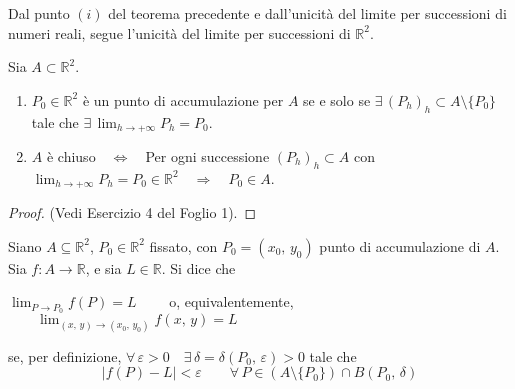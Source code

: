 
\begin{obs}
Dal punto $(i)$ del teorema precedente e dall'unicità del limite per successioni di numeri reali, segue l'unicità del limite per successioni di $\mathbb{R}^2$.
\end{obs}

\begin{proposition}
Sia $A \subset \mathbb{R}^2$.
\begin{enumerate}[labelindent=\parindent,leftmargin=*,label=\textnormal{(\roman*)},start=1]
\item $P_0 \in \mathbb{R}^2$ è un punto di accumulazione per $A$ se e solo se $\exists \, (P_h)_h \subset A \setminus \lbrace P_0 \rbrace$ tale che $\exists \, \displaystyle \lim_{h \rightarrow +\infty} P_h = P_0$.
\item $A$ è chiuso$\quad \Longleftrightarrow \quad$Per ogni successione $(P_h)_h \subset A$ con $\displaystyle \lim_{h \rightarrow +\infty} P_h = P_0 \in \mathbb{R}^2 \quad \Rightarrow \quad P_0 \in A$.
\end{enumerate}
\end{proposition}
\begin{proof}
(Vedi Esercizio 4 del Foglio 1).
\end{proof}

\begin{definition}
Siano $A \subseteq \mathbb{R}^2$, $P_0 \in \mathbb{R}^2$ fissato, con $P_0=(x_0,\, y_0)$ punto di accumulazione di $A$. Sia $f : A \longrightarrow \mathbb{R}$, e sia $L \in \mathbb{R}$.
Si dice che
\begin{center}
$\displaystyle \lim_{P \rightarrow P_0} f(P) = L \qquad$
o, equivalentemente,
$\displaystyle \qquad \lim_{(x,\, y) \rightarrow (x_0,\, y_0)} f(x,\, y) = L$
\end{center}
se, per definizione, $\forall \, \varepsilon > 0 \quad \exists \, \delta = \delta(P_0,\, \varepsilon) > 0$ tale che
$$|f(P) - L| < \varepsilon \qquad \forall \, P \in (A \setminus \lbrace P_0 \rbrace) \cap B(P_0,\, \delta)$$
\end{definition}

